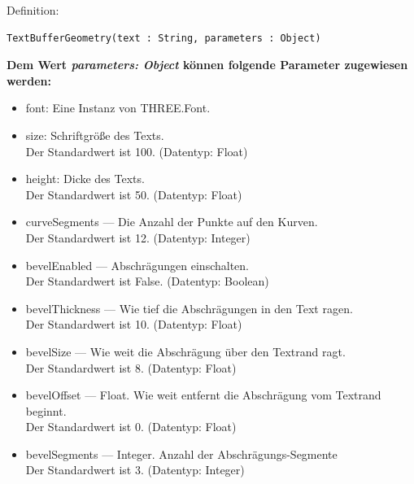 \begin{itemize}
Definition:
\begin{lstlisting}
TextBufferGeometry(text : String, parameters : Object)
\end{lstlisting}
\textbf{Dem Wert \textit{parameters: Object} können folgende Parameter zugewiesen werden:}
\begin{itemize}
    \item font: Eine Instanz von THREE.Font.
    \item size: Schriftgröße des Texts.\\ Der Standardwert ist 100. (Datentyp: Float)
    \item height: Dicke des Texts.\\ Der Standardwert ist 50. (Datentyp: Float)
    \item curveSegments — Die Anzahl der Punkte auf den Kurven.\\ Der Standardwert ist 12. (Datentyp: Integer)
    \item bevelEnabled — Abschrägungen einschalten.\\ Der Standardwert ist False. (Datentyp: Boolean)
    \item bevelThickness — Wie tief die Abschrägungen in den Text ragen.\\ Der Standardwert ist 10. (Datentyp: Float)
    \item bevelSize — Wie weit die Abschrägung über den Textrand ragt. \\ Der Standardwert ist 8. (Datentyp: Float)
    \item bevelOffset — Float.  Wie weit entfernt die Abschrägung vom Textrand beginnt.\\ Der Standardwert ist 0. (Datentyp: Float)
    \item bevelSegments — Integer. Anzahl der Abschrägungs-Segmente \\ Der Standardwert ist 3. (Datentyp: Integer)
\end{itemize}
\end{itemize}
\newpage
